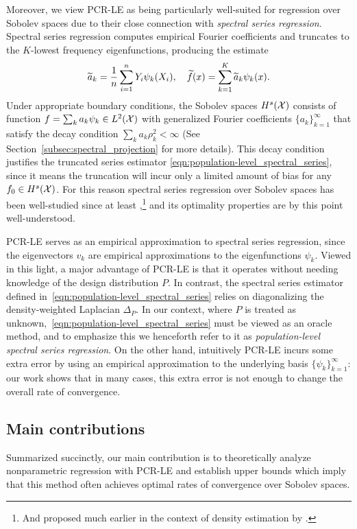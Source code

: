 Moreover, we view PCR-LE as being particularly well-suited for regression over Sobolev spaces due to their close connection with \emph{spectral series regression}. Spectral series regression computes empirical Fourier coefficients and truncates to the $K$-lowest frequency eigenfunctions, producing the estimate
\begin{equation}
\label{eqn:population-level_spectral_series}
\widetilde{a}_k = \frac{1}{n}\sum_{i = 1}^{n} Y_i \psi_k(X_i), \quad \widetilde{f}(x) = \sum_{k = 1}^{K} \widetilde{a}_k \psi_k(x).
\end{equation} 
Under appropriate boundary conditions, the Sobolev spaces $H^s(\mathcal{X})$ consists of function $f = \sum_{k} a_k \psi_k \in L^2(\mathcal{X})$ with generalized Fourier coefficients $\{a_k\}_{k = 1}^{\infty}$ that satisfy the decay condition $\sum_{k} a_k \rho_k^2 < \infty$ (See Section~\ref{subsec:spectral_projection} for more details). This decay condition justifies the truncated series estimator \eqref{eqn:population-level_spectral_series}, since it means the truncation will incur only a limited amount of bias for any $f_0 \in H^s(\mathcal{X})$. For this reason spectral series regression over Sobolev spaces has been well-studied since at least \citet{rice1984},\footnote{And proposed much earlier in the context of density estimation by \citet{cencov1962}.} and its optimality properties are by this point well-understood.

PCR-LE serves as an empirical approximation to spectral series regression, since the eigenvectors $v_k$ are empirical approximations to the eigenfunctions $\psi_k$. Viewed in this light, a major advantage of PCR-LE is that it operates without needing knowledge of the design distribution $P$. In contrast, the spectral series estimator defined in~\eqref{eqn:population-level_spectral_series} relies on diagonalizing the density-weighted Laplacian $\Delta_P$. In our context, where $P$ is treated as unknown,~\eqref{eqn:population-level_spectral_series} must be viewed as an oracle method, and to emphasize this we henceforth refer to it as \emph{population-level spectral series regression}. On the other hand, intuitively PCR-LE incurs some extra error by using an empirical approximation to the underlying basis $\{\psi_k\}_{k = 1}^{\infty}$: our work shows that in many cases, this extra error is not enough to change the overall rate of convergence.

\subsection{Main contributions}
Summarized succinctly, our main contribution is to theoretically analyze nonparametric regression with PCR-LE and establish upper bounds which imply that this method often achieves optimal rates of convergence over Sobolev spaces.

